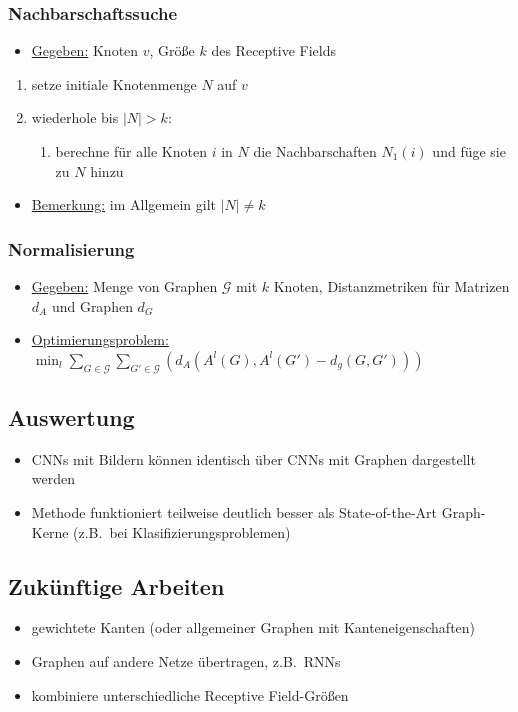 \subsubsection{Nachbarschaftssuche}

\begin{itemize}
  \item \underline{Gegeben:} Knoten $v$, Größe $k$ des Receptive Fields
\end{itemize}

\begin{enumerate}
  \item setze initiale Knotenmenge $N$ auf $v$
  \item wiederhole bis $|N| > k$:
    \begin{enumerate}
      \item berechne für alle Knoten $i$ in $N$ die Nachbarschaften $N_1(i)$ und füge sie zu $N$ hinzu
    \end{enumerate}
\end{enumerate}

\begin{itemize}
  \item \underline{Bemerkung:} im Allgemein gilt $|N| \neq k$
\end{itemize}

\subsubsection{Normalisierung}

\begin{itemize}
  \item \underline{Gegeben:} Menge von Graphen $\mathcal{G}$ mit $k$ Knoten, Distanzmetriken für Matrizen $d_A$ und Graphen $d_G$
  \item \underline{Optimierungsproblem:} $\min_l \sum_{G \in \mathcal{G}} \sum_{G' \in \mathcal{G}} {( d_A(A^l(G), A^l(G') - d_g(G, G')) )}$

\end{itemize}

\subsection{Auswertung}

\begin{itemize}
  \item CNNs mit Bildern können identisch über CNNs mit Graphen dargestellt werden
  \item Methode funktioniert teilweise deutlich besser als State-of-the-Art Graph-Kerne (z.B.\ bei Klasifizierungsproblemen)
\end{itemize}

\subsection{Zukünftige Arbeiten}

\begin{itemize}
  \item gewichtete Kanten (oder allgemeiner Graphen mit Kanteneigenschaften)
  \item Graphen auf andere Netze übertragen, z.B.\ RNNs
  \item kombiniere unterschiedliche Receptive Field-Größen
\end{itemize}
